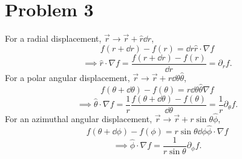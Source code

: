 \documentclass[12pt]{article}
\begin{document}
\section*{Problem 3}
For a radial displacement, $\vec{r}\to\vec{r}+\hat{r}\dd r$,
\[ f(r + \dd r) - f(r) = \dd r \hat{r}\cdot\nabla f \]
\[ \implies \hat{r}\cdot\nabla f = \frac{f(r + \dd r) - f(r)}{\dd r} = \partial_rf. \]
For a polar angular displacement, $\vec{r}\to\vec{r}+r\dd \theta \hat{\theta}$,
\[ f(\theta + \dd\theta) - f(\theta) = r\dd \theta \hat{\theta}\nabla f \]
\[ \implies \hat{\theta}\cdot\nabla f = \frac{1}{r}\frac{f(\theta + \dd\theta) - f(\theta)}{\dd\theta} = \frac{1}{r}\partial_\theta f. \]
For an azimuthal angular displacement, $\vec{r}\to\vec{r}+r\sin\theta\hat{\phi}$,
\[ f(\theta + \dd\phi) - f(\phi) = r\sin\theta\dd\phi\hat{\phi}\cdot\nabla f \]
\[ \implies \hat{\phi}\cdot\nabla f = \frac{1}{r\sin\theta}\partial_\phi f. \]
\end{document}
